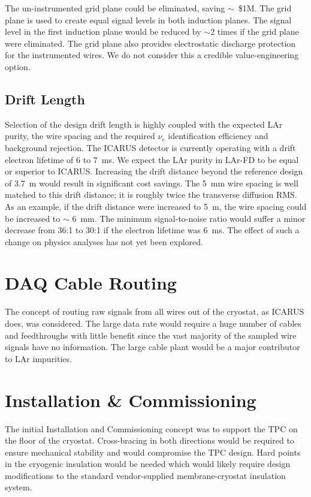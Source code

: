 The un-instrumented grid plane could be eliminated, saving $\sim$\ \$1M. The grid plane is used to create equal signal levels in both induction planes. The signal level in the first induction plane would be reduced by $\sim$2 times if the grid plane were eliminated. The grid plane also provides electrostatic discharge protection for the instrumented wires.
We do not consider this a credible value-engineering option.

\subsection{Drift Length}

Selection of the design drift length is highly coupled with the expected LAr purity, the wire spacing and the required $\nu_e$ identification efficiency and background rejection. The ICARUS detector is currently operating with a drift electron lifetime of 6  to 7~ms. We expect the LAr purity in LAr-FD to be equal or superior to ICARUS. Increasing the drift distance beyond the reference design of 3.7~m would result in significant cost savings. The 5~mm wire spacing is well matched to this drift distance; it is roughly twice the transverse diffusion RMS. As an example, if the drift distance were increased to 5~m, the wire spacing could be increased to $\sim$ 6~mm. The minimum signal-to-noise ratio would suffer a minor decrease from 36:1 to 30:1 if the electron lifetime was 6~ms. The effect of such a change on physics analyses has not yet been explored.

\section{DAQ Cable Routing} %

The concept of routing raw signals from all wires out of the cryostat, as ICARUS does, was considered.%
The large data rate would require a huge number of cables and feedthroughs with little benefit since the vast majority of the sampled wire signals have no information. The large cable plant would be a major contributor to LAr impurities.

\section{Installation \& Commissioning}

The initial Installation and Commissioning concept was to support the %
TPC on the floor of the cryostat. Cross-bracing in both directions would be required to ensure mechanical stability and would compromise the TPC design. Hard points in the cryogenic insulation would be needed  which would likely require design modifications to the standard vendor-supplied membrane-cryostat insulation system. 

